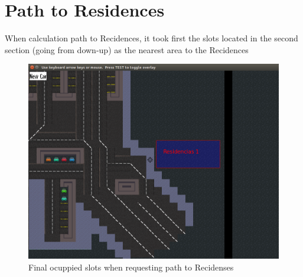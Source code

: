 \section{Path to Residences}
When calculation path to Recidences, it took first the slots located in the second section (going from down-up) as the nearest 
area to the Recidences
\begin{figure}[H]
    \centering
    \includegraphics[width=.6\textwidth]{images/path_to_recidenses.png}
    \caption{Final ocuppied slots when requesting path to Recidenses}
    \label{fig:path_to_recidenses}
\end{figure}
